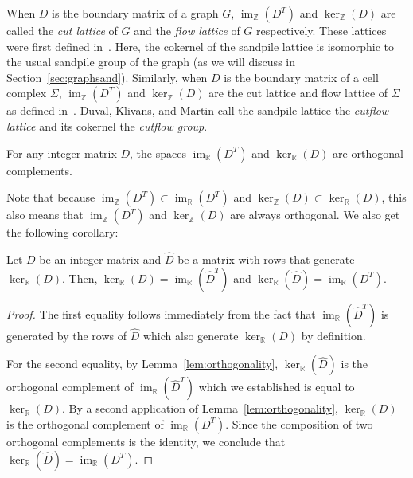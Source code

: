 \documentclass[ALCO,ThmDefs,Unicode,epreuves]{cedram}
\newcommand{\R}{\mathbb{R}}
\newcommand{\Z}{\mathbb{Z}}
\newcommand{\what}{\widehat}
\DeclareMathOperator{\Ima}{im}
\begin{document}
\begin{rema} When $D$ is the boundary matrix of a graph $G$, $\Ima_\Z(D^T)$ and $\ker_\Z(D)$ are called the \emph{cut lattice} of $G$ and the \emph{flow lattice} of $G$ respectively. These lattices were first defined in~\cite{Bacher}. Here, the cokernel of the sandpile lattice is isomorphic to the usual sandpile group of the graph (as we will discuss in Section~\ref{sec:graphsand}). Similarly, when $D$ is the boundary matrix of a cell complex $\Sigma$, $\Ima_\Z(D^T)$ and $\ker_\Z(D)$ are the cut lattice and flow lattice of $\Sigma$ as defined in~\cite{CutsFlows}. Duval, Klivans, and Martin call the sandpile lattice the \emph{cutflow lattice} and its cokernel the \emph{cutflow group}. 
\end{rema}


\begin{lemma}\label{lem:orthogonality}
For any integer matrix $D$, the spaces $\Ima_\R(D^T)$ and $\ker_\R(D)$ are orthogonal complements. 
\end{lemma}

Note that because $\Ima_\Z(D^T) \subset \Ima_\R(D^T)$ and $\ker_\Z(D) \subset \ker_\R(D)$, this also means that $\Ima_\Z(D^T)$ and $\ker_\Z(D)$ are always orthogonal. We also get the following corollary:

\begin{coro}\label{cor:cutofflow}
Let $D$ be an integer matrix and $\what D$ be a matrix with rows that generate $\ker_\R(D)$. Then, $\ker_\R(D) = \Ima_\R(\what D^T)$ and $\ker_\R(\what D) = \Ima_\R(D^T)$. 
\end{coro}

\begin{proof}
The first equality follows immediately from the fact that $\Ima_\R(\what D^T)$ is generated by the rows of $\what D$ which also generate $\ker_\R(D)$ by definition. 

For the second equality, by Lemma~\ref{lem:orthogonality}, $\ker_\R(\what D)$ is the orthogonal complement of $\Ima_\R(\what D^T)$ which we established is equal to $\ker_\R(D)$. By a second application of Lemma~\ref{lem:orthogonality}, $\ker_\R(D)$ is the orthogonal complement of $\Ima_\R(D^T)$. Since the composition of two orthogonal complements is the identity, we conclude that $\ker_\R(\what D) = \Ima_\R(D^T)$. 
\end{proof}
\end{document}
